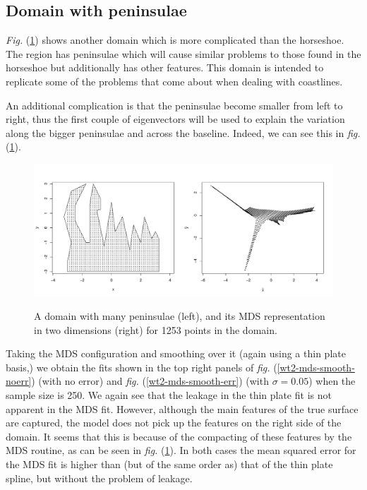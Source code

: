 \documentclass[a4paper,10pt]{article}
\newcommand{\fig}[1]{\emph{fig.} (\ref{#1})}
\newcommand{\Fig}[1]{\emph{Fig.} (\ref{#1})}
\begin{document}




\subsection{Domain with peninsulae}

\Fig{wt2dia} shows another domain which is more complicated than the horseshoe. The region has peninsulae which will cause similar problems to those found in the horseshoe but additionally has other features. This domain is intended to replicate some of the problems that come about when dealing with coastlines.

An additional complication is that the peninsulae become smaller from left to right, thus the first couple of eigenvectors will be used to explain the variation along the bigger peninsulae and across the baseline. Indeed, we can see this in \fig{wt2dia}.

\begin{figure}
\centering
\includegraphics[width=6in]{figs/wt2-mds.pdf}\\
\caption{A domain with many peninsulae (left), and its MDS representation in two dimensions (right) for 1253 points in the domain.}
\label{wt2dia}
\end{figure}

Taking the MDS configuration and smoothing over it (again using a thin plate basis,) we obtain the fits shown in the top right panels of \fig{wt2-mds-smooth-noerr} (with no error) and \fig{wt2-mds-smooth-err} (with $\sigma=0.05$) when the sample size is 250. We again see that the leakage in the thin plate fit is not apparent in the MDS fit. However, although the main features of the true surface are captured, the model does not pick up the features on the right side of the domain. It seems that this is because of the compacting of these features by the MDS routine, as can be seen in \fig{wt2dia}. In both cases the mean squared error for the MDS fit is higher than (but of the same order as) that of the thin plate spline, but without the problem of leakage.
\end{document}
